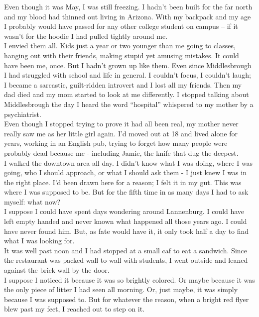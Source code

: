 \documentclass[a5paper]{scrartcl}
\begin{document}
Even though it was May, I was still freezing. I hadn't been built for the far north and my blood had thinned out living in Arizona. With my backpack and my age I probably would have passed for any other college student on campus -- if it wasn't for the hoodie I had pulled tightly around me.\\


I envied them all. Kids just a year or two younger than me going to classes, hanging out with their friends, making  stupid yet amusing mistakes. It could have been me, once. But I hadn't grown up like them. Even since Middlesbrough I had struggled with school and life in general. I couldn't focus, I couldn't laugh; I became a sarcastic, guilt-ridden introvert and I lost all my friends. Then my dad died and my mom started to look at me differently. I stopped talking about Middlesbrough the day I heard the word \enquote{hospital} whispered to my mother by a psychiatrist.\\


Even though I stopped trying to prove it had all been real, my mother never really saw me as her little girl again. I'd moved out at 18 and lived alone for years, working in an English pub, trying to forget how many people were probably dead because me - including Jamie, the knife that dug the deepest.\\


I walked the downtown area all day. I didn't know what I was doing, where I was going, who I should approach, or what I should ask them - I just knew I was in the right place. I'd been drawn here for a reason; I felt it in my gut. This was where I was supposed to be. But for the fifth time in as many days I had to ask myself: what now?\\


I suppose I could have spent days wondering around Lannenburg. I could have left empty handed and never known what happened all those years ago. I could have never found him. But, as fate would have it, it only took half a day to find what I was looking for.\\


It was well past noon and I had stopped at a small caf     to eat a sandwich. Since the restaurant was packed wall to wall with students, I went outside and leaned against the brick wall by the door.\\


I suppose I noticed it because it was so brightly colored. Or maybe because it was the only piece of litter I had seen all morning. Or, just maybe, it was simply because I was supposed to. But for whatever the reason, when a bright red flyer blew past my feet, I reached out to step on it.\\
\end{document}
